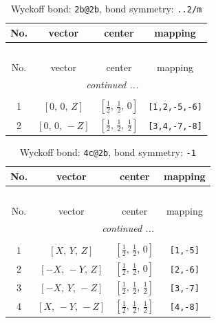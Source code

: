 \documentclass[fleqn,8pt]{jsarticle}
\begin{document}
\renewcommand{\arraystretch}{1.2}
\begin{longtable}{cccc}
\caption{Wyckoff bond: {\tt 2b@2b}, bond symmetry: {\tt ..2/m}}
 \\
 \hline \hline
No. & vector & center & mapping \\ \hline \endfirsthead

\multicolumn{3}{l}{\tablename\ \thetable{}} \\
 \hline \hline
No. & vector & center & mapping \\ \hline \endhead

 \hline \hline
\multicolumn{3}{r}{\footnotesize\it continued ...} \\ \endfoot

 \hline \hline
\multicolumn{3}{r}{} \\ \endlastfoot

1 & $\left[ 0,\, 0,\, Z \right]$ & $\left[ \frac{1}{2},\, \frac{1}{2},\, 0 \right]$ & {\tt [1,2,-5,-6]} \\ \hline
2 & $\left[ 0,\, 0,\, - Z \right]$ & $\left[ \frac{1}{2},\, \frac{1}{2},\, \frac{1}{2} \right]$ & {\tt [3,4,-7,-8]} \\
\end{longtable}
\renewcommand{\arraystretch}{1.2}
\begin{longtable}{cccc}
\caption{Wyckoff bond: {\tt 4c@2b}, bond symmetry: {\tt -1}}
 \\
 \hline \hline
No. & vector & center & mapping \\ \hline \endfirsthead

\multicolumn{3}{l}{\tablename\ \thetable{}} \\
 \hline \hline
No. & vector & center & mapping \\ \hline \endhead

 \hline \hline
\multicolumn{3}{r}{\footnotesize\it continued ...} \\ \endfoot

 \hline \hline
\multicolumn{3}{r}{} \\ \endlastfoot

1 & $\left[ X,\, Y,\, Z \right]$ & $\left[ \frac{1}{2},\, \frac{1}{2},\, 0 \right]$ & {\tt [1,-5]} \\ \hline
2 & $\left[ - X,\, - Y,\, Z \right]$ & $\left[ \frac{1}{2},\, \frac{1}{2},\, 0 \right]$ & {\tt [2,-6]} \\ \hline
3 & $\left[ - X,\, Y,\, - Z \right]$ & $\left[ \frac{1}{2},\, \frac{1}{2},\, \frac{1}{2} \right]$ & {\tt [3,-7]} \\ \hline
4 & $\left[ X,\, - Y,\, - Z \right]$ & $\left[ \frac{1}{2},\, \frac{1}{2},\, \frac{1}{2} \right]$ & {\tt [4,-8]} \\
\end{longtable}
\end{document}
